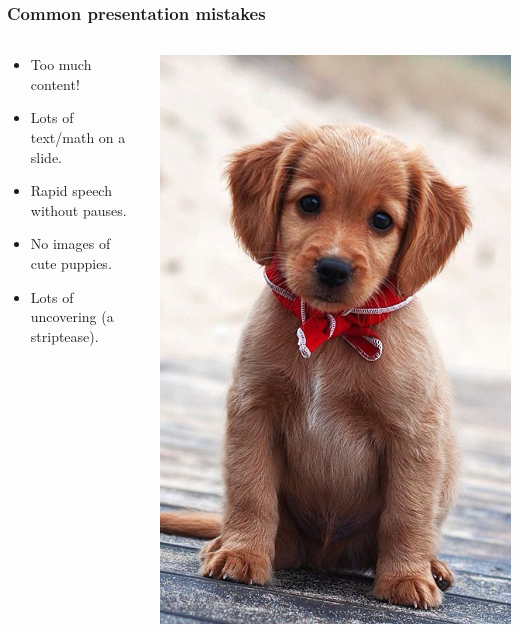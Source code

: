 \documentclass{beamer}
\begin{document}
\begin{frame}
\frametitle{Common presentation mistakes}

\begin{columns}
\begin{column}{.65\textwidth}
\begin{itemize}
\item Too much content! \\[3ex]
\item Lots of text/math on a slide. \\[3ex]
\item Rapid speech without pauses. \\[3ex]
\item No images of cute puppies.  \\[3ex]
\item Lots of uncovering (a striptease).
\end{itemize}
\end{column}
\begin{column}{.35\textwidth}
\includegraphics[height=.66\textheight]{puppy.jpg}
\end{column}
\end{columns}
\end{frame}
\end{document}
